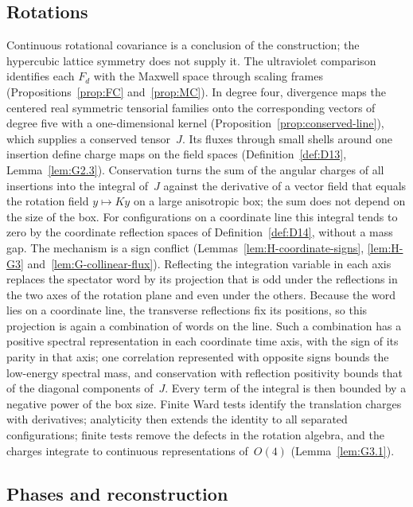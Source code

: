 \subsection{Rotations}\label{sec:strategy-rotations}

Continuous rotational covariance is a conclusion of the construction; the hypercubic lattice symmetry does not supply it. The ultraviolet comparison identifies each $F_d$ with the Maxwell space through scaling frames (Propositions~\ref{prop:FC} and~\ref{prop:MC}). In degree four, divergence maps the centered real symmetric tensorial families onto the corresponding vectors of degree five with a one-dimensional kernel (Proposition~\ref{prop:conserved-line}), which supplies a conserved tensor~$J$. Its fluxes through small shells around one insertion define charge maps on the field spaces (Definition~\ref{def:D13}, Lemma~\ref{lem:G2.3}). Conservation turns the sum of the angular charges of all insertions into the integral of~$J$ against the derivative of a vector field that equals the rotation field $y\mapsto Ky$ on a large anisotropic box; the sum does not depend on the size of the box. For configurations on a coordinate line this integral tends to zero by the coordinate reflection spaces of Definition~\ref{def:D14}, without a mass gap. The mechanism is a sign conflict (Lemmas~\ref{lem:H-coordinate-signs}, \ref{lem:H-G3} and~\ref{lem:G-collinear-flux}). Reflecting the integration variable in each axis replaces the spectator word by its projection that is odd under the reflections in the two axes of the rotation plane and even under the others. Because the word lies on a coordinate line, the transverse reflections fix its positions, so this projection is again a combination of words on the line. Such a combination has a positive spectral representation in each coordinate time axis, with the sign of its parity in that axis; one correlation represented with opposite signs bounds the low-energy spectral mass, and conservation with reflection positivity bounds that of the diagonal components of~$J$. Every term of the integral is then bounded by a negative power of the box size. Finite Ward tests identify the translation charges with derivatives; analyticity then extends the identity to all separated configurations; finite tests remove the defects in the rotation algebra, and the charges integrate to continuous representations of~$O(4)$ (Lemma~\ref{lem:G3.1}).

\subsection{Phases and reconstruction}\label{sec:strategy-reconstruction}

